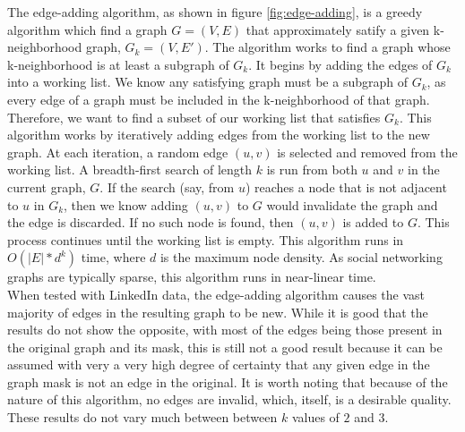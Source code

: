 \indent The edge-adding algorithm, as shown in figure \ref{fig:edge-adding}, is a greedy algorithm which find a graph $G = (V,E)$ that approximately satify a given k-neighborhood graph, $G_k = (V, E')$. The algorithm works to find a graph whose k-neighborhood is at least a subgraph of $G_k$. It begins by adding the edges of $G_k$ into a working list. We know any satisfying graph must be a subgraph of $G_k$, as every edge of a graph must be included in the k-neighborhood of that graph. Therefore, we want to find a subset of our working list that satisfies $G_k$. This algorithm works by iteratively adding edges from the working list to the new graph.  At each iteration, a random edge $(u,v)$ is selected and removed from the working list. A breadth-first search of length $k$ is run from both $u$ and $v$ in the current graph, $G$. If the search (say, from $u$) reaches a node that is not adjacent to $u$ in $G_k$, then we know adding $(u,v)$ to $G$ would invalidate the graph and the edge is discarded. If no such node is found, then $(u,v)$ is added to $G$. This process continues until the working list is empty. This algorithm runs in $O(|E|*d^k)$ time, where $d$ is the maximum node density. As social networking graphs are typically sparse, this algorithm runs in near-linear time. \\

\indent When tested with LinkedIn data, the edge-adding algorithm causes the vast majority of edges in the resulting graph to be new. While it is good that the results do not show the opposite, with most of the edges being those present in the original graph and its mask, this is still not a good result because it can be assumed with very a very high degree of certainty that any given edge in the graph mask is not an edge in the original. It is worth noting that because of the nature of this algorithm, no edges are invalid, which, itself, is a desirable quality. These results do not vary much between between $k$ values of $2$ and $3$. \\
